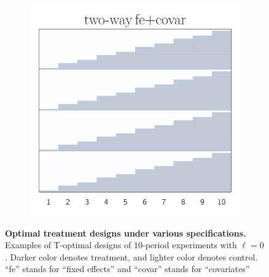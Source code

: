 \begin{figure}[t!]
\begin{subfigure}{0.2\textwidth}
	\end{subfigure}%
	\begin{subfigure}{0.2\textwidth}
		\centering
		\includegraphics[width=1\linewidth]{plots/illustration/two-way-fe-covar.pdf}
	\end{subfigure}
	\caption{\textbf{Optimal treatment designs under various specifications.} Examples of T-optimal designs of $10$-period experiments with $\ell = 0$. Darker color denotes treatment, and lighter color denotes control. ``fe'' stands for ``fixed effects'' and ``covar'' stands for ``covariates''
	}
	\label{fig:various-optimal-design}
\end{figure}
